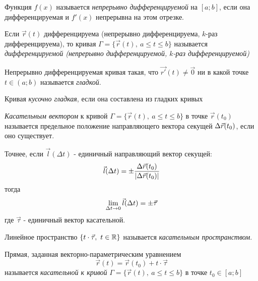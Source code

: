 \begin{definition}
	Функция $f(x)$ называется \textit{непрерывно дифференцируемой} на $[a; b]$, если она дифференцируемая и $f'(x)$ непрерывна на этом отрезке.
\end{definition}

\begin{definition}
	Если $\vec{r}(t)$ дифференцируема (непрерывно дифференцируема, $k$-раз дифференцируема), то кривая $\Gamma = \{\vec{r}(t),\ a \le t \le b\}$ называется \textit{дифференцируемой (непрерывно дифференцируемой, $k$-раз дифференцируемой)}
\end{definition}

\begin{definition}
	Непрерывно дифференцируемая кривая такая, что $\vec{r'}(t) \neq \vec{0}$ ни в какой точке $t \in (a; b)$ называется \textit{гладкой}.
\end{definition}

\begin{definition}
	Кривая \textit{кусочно гладкая}, если она составлена из гладких кривых
\end{definition}

\begin{definition}
	\textit{Касательным вектором} к кривой $\Gamma = \{\vec{r}(t),\ a \le t \le b\}$ в точке $\vec{r}(t_0)$ называется предельное положение направляющего вектора секущей $\Delta\vec{r}(t_0)$, если оно существует.
	
	Точнее, если $\vec{l}(\Delta t)$ - единичный направляющий вектор секущей:
	\[
		\vec{l}(\Delta t) = \pm \frac{\Delta\vec{r}(t_0)}{|\Delta\vec{r}(t_0)|}
	\]
	тогда
	\[
		\lim\limits_{\Delta t \to 0} \vec{l}(\Delta t) = \pm \vec{\tau}
	\]
	где $\vec{\tau}$ - единичный вектор касательной.
\end{definition}

\begin{definition}
	Линейное пространство $\{t \cdot \vec{\tau},\ t \in \mathbb{R}\}$ называется \textit{касательным пространством}.
\end{definition}

\begin{definition}
	Прямая, заданная векторно-параметрическим уравнением
	\[
		\vec{r}(t) = \vec{r}(t_0) + t\cdot \vec{\tau}
	\]
	называется \textit{касательной к кривой} $\Gamma = \{\vec{r}(t),\ a \le t \le b\}$ в точке $t_0 \in [a; b]$
\end{definition}


